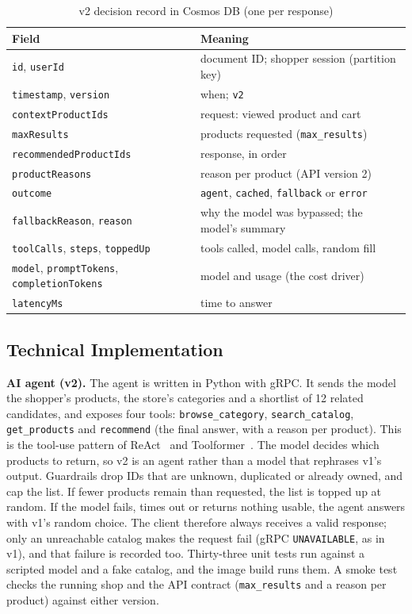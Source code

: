 \documentclass[conference]{IEEEtran}
\begin{document}
\begin{table}[t]
\caption{v2 decision record in Cosmos DB (one per response)}
\label{tab:record}
\centering\footnotesize
\begin{tabularx}{\columnwidth}{@{}L{0.47\columnwidth}Y@{}}
\toprule
Field & Meaning \\
\midrule
\texttt{id}, \texttt{userId} & document ID; shopper session (partition key) \\
\texttt{timestamp}, \texttt{version} & when; \texttt{v2} \\
\texttt{contextProductIds} & request: viewed product and cart \\
\texttt{maxResults} & products requested (\texttt{max\_results}) \\
\texttt{recommendedProductIds} & response, in order \\
\texttt{productReasons} & reason per product (API version 2) \\
\texttt{outcome} & \texttt{agent}, \texttt{cached}, \texttt{fallback} or \texttt{error} \\
\texttt{fallbackReason}, \texttt{reason} & why the model was bypassed; the model's summary \\
\texttt{toolCalls}, \texttt{steps}, \texttt{toppedUp} & tools called, model calls, random fill \\
\texttt{model}, \texttt{promptTokens}, \texttt{completionTokens} & model and usage (the cost driver) \\
\texttt{latencyMs} & time to answer \\
\bottomrule
\end{tabularx}
\end{table}

\subsection{Technical Implementation}

\textbf{AI agent (v2).} The agent is written in Python with gRPC. It sends
the model the shopper's products, the store's categories and a shortlist
of 12 related candidates, and exposes four tools: \texttt{browse\_category},
\texttt{search\_catalog}, \texttt{get\_products} and \texttt{recommend}
(the final answer, with a reason per product). This is the tool-use pattern
of ReAct~\cite{react} and Toolformer~\cite{toolformer}. The model decides
which products to return, so v2 is an agent rather than a model that
rephrases v1's output. Guardrails drop IDs that are unknown, duplicated or
already owned, and cap the list. If fewer products remain than requested,
the list is topped up at random. If the model fails, times out or returns
nothing usable, the agent answers with v1's random choice. The client
therefore always receives a valid response; only an unreachable catalog
makes the request fail (gRPC \texttt{UNAVAILABLE}, as in v1), and that
failure is recorded too. Thirty-three unit tests run against a scripted
model and a fake catalog, and the image build runs them. A smoke test checks
the running shop and the API contract (\texttt{max\_results} and a reason
per product) against either version.
\end{document}
